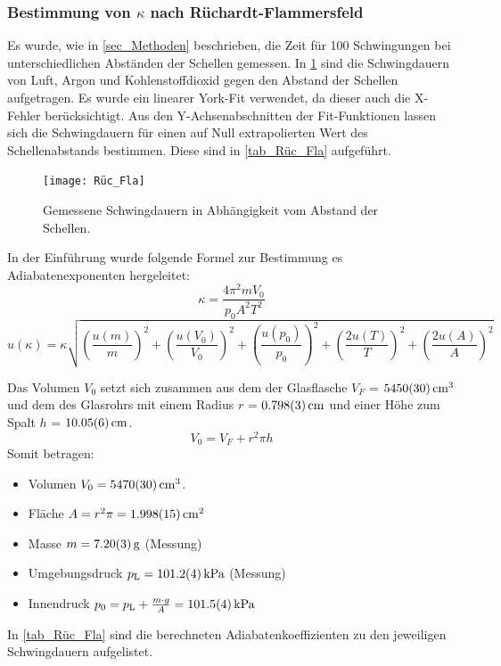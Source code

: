 \documentclass[
	a4paper,
	12pt,
	pagesize,
	ngerman
]{scrartcl}
\begin{document}
	\subsubsection{Bestimmung von $\kappa$ nach Rüchardt-Flammersfeld}
	Es wurde, wie in \cref{sec_Methoden} beschrieben, die Zeit für 100 Schwingungen bei unterschiedlichen Abständen der Schellen gemessen.
	In \cref{fig_Rüc_Fla} sind die Schwingdauern von Luft, Argon und Kohlenstoffdioxid gegen den Abstand der Schellen aufgetragen. 
	Es wurde ein linearer York-Fit verwendet, da dieser auch die X-Fehler berücksichtigt.
	Aus den Y-Achsenabschnitten der Fit-Funktionen lassen sich die Schwingdauern für einen auf Null extrapolierten Wert des Schellenabstands bestimmen.
	Diese sind in \cref{tab_Rüc_Fla} aufgeführt.
	
	\begin{figure}[H]
		\texttt{[image: Rüc\_Fla]}
		\centering
		\caption{Gemessene Schwingdauern in Abhängigkeit vom Abstand der Schellen.}
		\label{fig_Rüc_Fla}
		\centering
	\end{figure} 

	In der Einführung wurde folgende Formel zur Bestimmung es Adiabatenexponenten hergeleitet:
	\begin{equation}
	\kappa = \frac{4\pi^2mV_0}{p_0 A^2 T^2}
	\label{eq_Rüc_Fla_Kappa}
	\end{equation}
	\begin{equation}
	u(\kappa) = \kappa \sqrt{\left(\frac{u(m)}{m}\right)^2+\left(\frac{u(V_0)}{V_0}\right)^2+\left(\frac{u(p_0)}{p_0}\right)^2+\left(\frac{2u(T)}{T}\right)^2+\left(\frac{2u(A)}{A}\right)^2}
	\end{equation}
	
	Das Volumen $V_0$ setzt sich zusammen aus dem der Glasflasche $V_F$ = $\SI{5450+-30}{cm^3}$ und dem des Glasrohrs mit einem Radius $r$ = $\SI{0,798+-0,003}{cm}$ und einer Höhe zum Spalt $h$ = $\SI{10,05+-0.06}{cm}$.
	\begin{equation}
		V_0 = V_F + r^2 \pi h
	\end{equation}
	Somit betragen:
	\begin{itemize}
		\item Volumen $V_0 = \SI{5470+-30}{cm^3}$.
		\item Fläche $A = r^2\pi = \SI{1,998+-0,015}{cm^2}$
		\item Masse $m = \SI{7,2+-0,03}{g}$ (Messung)
		\item Umgebungsdruck $p_\text{L}=\SI{101,2+-0,4}{kPa}$ (Messung)
		\item Innendruck $p_0 = p_\text{L} + \frac{m\cdot g}{A} = \SI{101,5+-0,4}{kPa}$ 
	\end{itemize}
	In \cref{tab_Rüc_Fla} sind die berechneten Adiabatenkoeffizienten zu den jeweiligen Schwingdauern aufgelistet.
	
\end{document}
